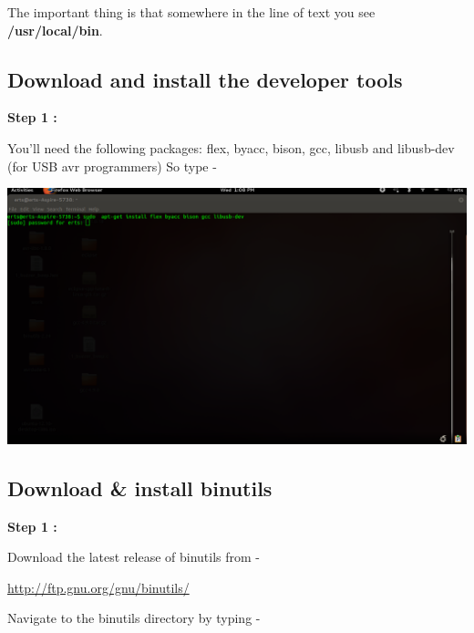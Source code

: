 \begin{flushleft}
\medskip

The important thing is that somewhere in the line of text you see \textbf{/usr/local/bin}.
\medskip



\subsection{Download and install the developer tools }

\textbf{Step 1 : }

You'll need the following packages: flex, byacc, bison, gcc, libusb and libusb-dev (for USB avr programmers) 
So type - 

\medskip


\medskip

\includegraphics[scale=0.3]{f4}

\medskip

\subsection{Download \& install binutils}
\textbf{Step 1 : }
\medskip

Download the latest release of binutils from - 

\url{http://ftp.gnu.org/gnu/binutils/}

\medskip

Navigate to the binutils directory by typing - 

\medskip


\medskip


\end{flushleft}
